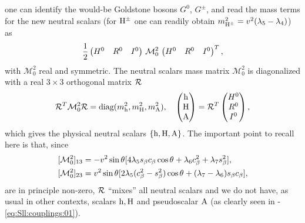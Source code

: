 \documentclass[12pt,a4paper]{article}
\begin{document}
 one can identify the would-be Goldstone bosons $G^0$, $G^\pm$, and read the mass terms for the new neutral scalars (for ${\rm H}^\pm$ one can readily obtain $m_{{\rm H}^\pm}^2=v_{}^2(\lambda_5-\lambda_4)$) as
 \begin{equation}
\frac{1}{2} \begin{pmatrix}{H}^0 & {R}^0 & {I}^0\end{pmatrix}\,\mathcal M_0^2\,\begin{pmatrix}{H}^0 & {R}^0 & {I}^0\end{pmatrix}^T,
 \end{equation}
with $\mathcal M_0^2$ real and symmetric. The neutral scalars mass matrix $\mathcal M_0^2$ is diagonalized with a real $3\times 3$ orthogonal matrix $\mathcal R$
\begin{equation}\label{eq:Scalar:R}
\mathcal R^T\mathcal M_0^2\mathcal R=\text{diag}(m_{{\rm h}}^2,m_{{\rm H}}^2,m_{{\rm A}}^2),\quad \begin{pmatrix}{\rm h}\\ {\rm H}\\ {\rm A}\end{pmatrix}=\mathcal R^T\begin{pmatrix}{H}^0 \\ {R}^0 \\ {I}^0\end{pmatrix},
\end{equation}
which gives the physical neutral scalars $\{{\rm h},{\rm H},{\rm A}\}$. 
The important point to recall here is that, since
\begin{equation}
\begin{aligned}
 &[\mathcal M_0^2]_{13}=-v_{}^2\sin\theta_{}[4\lambda_5s_\beta c_\beta\cos\theta_{}+\lambda_6c_\beta^2+\lambda_7s_\beta^2],\\
 &[\mathcal M_0^2]_{23}=v_{}^2\sin\theta_{}[2\lambda_5(c_\beta^2-s_\beta^2)\cos\theta_{}+(\lambda_7-\lambda_6)s_\beta c_\beta],
 \end{aligned}
\end{equation}
are in principle non-zero, $\mathcal R$ ``mixes'' all neutral scalars and we do not have, as usual in other contexts, scalars ${\rm h},{\rm H}$ and pseudoscalar ${\rm A}$ (as clearly seen in -\eqref{eq:Sll:couplings:01}).

\end{document}
